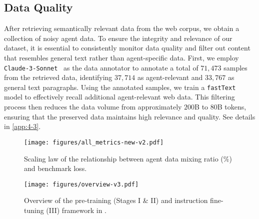 \subsection{Data Quality}
\label{sec:data-phase3}
After retrieving semantically relevant data from the web corpus, we obtain a collection of noisy agent data. To ensure the integrity and relevance of our dataset, it is essential to consistently monitor data quality and filter out content that resembles general text rather than agent-specific data.
First, we employ \texttt{Claude-3-Sonnet}~\cite{claude-3} as the data annotator to annotate a total of $71,473$ samples from the retrieved data, identifying $37,714$ as agent-relevant and $33,767$ as general text paragraphs.
Using the annotated samples, we train a \texttt{fastText}~\cite{joulin2016fasttext} model to effectively recall additional agent-relevant web data. 
This filtering process then reduces the data volume from approximately $200$B to $80$B tokens, ensuring that the preserved data maintains high relevance and quality. See details in \cref{app:4-3}.

\begin{figure}[t]
  \centering
  \texttt{[image: figures/all\_metrics-new-v2.pdf]}
  \caption{Scaling law of the relationship between agent data mixing ratio ($\%$) and benchmark loss. 
  }
  \label{fig:sl}
\end{figure}

\begin{figure*}[t]
  \centering
  \texttt{[image: figures/overview-v3.pdf]}
  \caption{
  Overview of the pre-training (Stages I \& II) and instruction fine-tuning (III) framework in \method.
  }
  \vspace{-2ex}
  \label{fig:overview}
\end{figure*}

